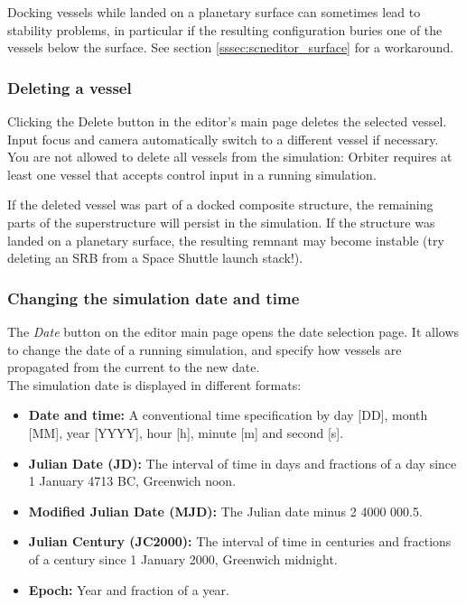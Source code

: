 \documentclass[Orbiter User Manual.tex]{subfiles}
\begin{document}
\noindent
Docking vessels while landed on a planetary surface can sometimes lead to stability problems, in particular if the resulting configuration buries one of the vessels below the surface. See section \ref{sssec:scneditor_surface} for a workaround.

\subsubsection{Deleting a vessel}
Clicking the Delete button in the editor's main page deletes the selected vessel. Input focus and camera automatically switch to a different vessel if necessary.\\
You are not allowed to delete all vessels from the simulation: Orbiter requires at least one vessel that accepts control input in a running simulation.\\


\noindent
If the deleted vessel was part of a docked composite structure, the remaining parts of the superstructure will persist in the simulation. If the structure was landed on a planetary surface, the resulting remnant may become instable (try deleting an SRB from a Space Shuttle launch stack!).

\subsubsection{Changing the simulation date and time}
The \textit{Date} button on the editor main page opens the date selection page. It allows to change the date of a running simulation, and specify how vessels are propagated from the current to the new date.\\
The simulation date is displayed in different formats:

\begin{itemize}
\item \textbf{Date and time:} A conventional time specification by day [DD], month [MM], year [YYYY], hour [h], minute [m] and second [s].
\item \textbf{Julian Date (JD):} The interval of time in days and fractions of a day since 1 January 4713 BC, Greenwich noon.
\item \textbf{Modified Julian Date (MJD):} The Julian date minus 2 4000 000.5.
\item \textbf{Julian Century (JC2000):} The interval of time in centuries and fractions of a century since 1 January 2000, Greenwich midnight.
\item \textbf{Epoch:} Year and fraction of a year.
\end{itemize}
\end{document}
